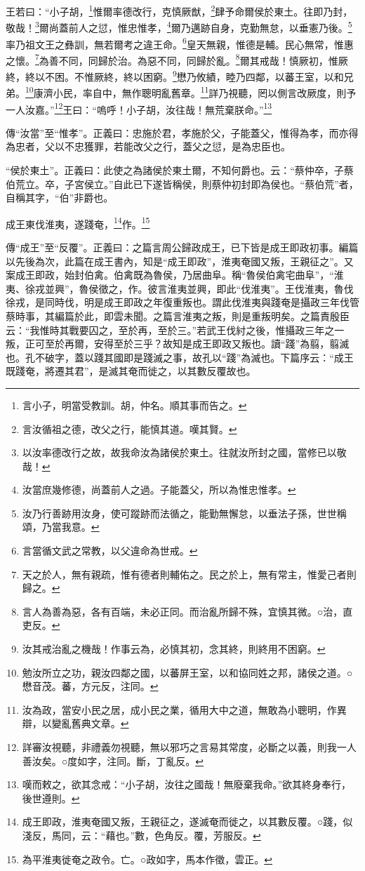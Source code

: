王若曰：“小子胡，\footnote{言小子，明當受教訓。胡，仲名。順其事而告之。}惟爾率德改行，克慎厥猷，\footnote{言汝循祖之德，改父之行，能慎其道。嘆其賢。}肆予命爾侯於東土。往即乃封，敬哉！\footnote{以汝率德改行之故，故我命汝為諸侯於東土。往就汝所封之國，當修已以敬哉！}爾尚蓋前人之愆，惟忠惟孝，\footnote{汝當庶幾修德，尚蓋前人之過。子能蓋父，所以為惟忠惟孝。}爾乃邁跡自身，克勤無怠，以垂憲乃後。\footnote{汝乃行善跡用汝身，使可蹤跡而法循之，能勤無懈怠，以垂法子孫，世世稱頌，乃當我意。}率乃祖文王之彝訓，無若爾考之違王命。\footnote{言當循文武之常教，以父違命為世戒。}皇天無親，惟德是輔。民心無常，惟惠之懷。\footnote{天之於人，無有親疏，惟有德者則輔佑之。民之於上，無有常主，惟愛己者則歸之。}為善不同，同歸於治。為惡不同，同歸於亂。\footnote{言人為善為惡，各有百端，未必正同。而治亂所歸不殊，宜慎其微。○治，直吏反。}爾其戒哉！慎厥初，惟厥終，終以不困。不惟厥終，終以困窮。\footnote{汝其戒治亂之機哉！作事云為，必慎其初，念其終，則終用不困窮。}懋乃攸績，睦乃四鄰，以蕃王室，以和兄弟。\footnote{勉汝所立之功，親汝四鄰之國，以蕃屏王室，以和協同姓之邦，諸侯之道。○懋音茂。蕃，方元反，注同。}康濟小民，率自中，無作聰明亂舊章。\footnote{汝為政，當安小民之居，成小民之業，循用大中之道，無敢為小聰明，作異辯，以變亂舊典文章。}詳乃視聽，罔以側言改厥度，則予一人汝嘉。”\footnote{詳審汝視聽，非禮義勿視聽，無以邪巧之言易其常度，必斷之以義，則我一人善汝矣。○度如字，注同。斷，丁亂反。}王曰：“嗚呼！小子胡，汝往哉！無荒棄朕命。”\footnote{嘆而敕之，欲其念戒：“小子胡，汝往之國哉！無廢棄我命。”欲其終身奉行，後世遵則。}


{\noindent\zhuan{}\fzbyks 傳“汝當”至“惟孝”。正義曰：忠施於君，孝施於父，子能蓋父，惟得為孝，而亦得為忠者，父以不忠獲罪，若能改父之行，蓋父之愆，是為忠臣也。 \par}

{\noindent\shu{}\fzkt “侯於東土”。正義曰：此使之為諸侯於東土爾，不知何爵也。云：“蔡仲卒，子蔡伯荒立。卒，子宮侯立。”自此已下遂皆稱侯，則蔡仲初封即為侯也。“蔡伯荒”者，自稱其字，“伯”非爵也。 \par}

成王東伐淮夷，遂踐奄，\footnote{成王即政，淮夷奄國又叛，王親征之，遂滅奄而徙之，以其數反覆。○踐，似淺反，馬同，云：“藉也。”數，色角反。覆，芳服反。}作。\footnote{為平淮夷徙奄之政令。亡。○政如字，馬本作徵，雲正。}


{\noindent\zhuan{}\fzbyks 傳“成王”至“反覆”。正義曰：之篇言周公歸政成王，已下皆是成王即政初事。編篇以先後為次，此篇在成王書內，知是“成王即政”，淮夷奄國又叛，王親征之”。又案成王即政，始封伯禽。伯禽既為魯侯，乃居曲阜。稱“魯侯伯禽宅曲阜”，“淮夷、徐戎並興”，魯侯徵之，作。彼言淮夷並興，即此“伐淮夷”。王伐淮夷，魯伐徐戎，是同時伐，明是成王即政之年復重叛也。謂此伐淮夷與踐奄是攝政三年伐管蔡時事，其編篇於此，即雲未聞。之篇言淮夷之叛，則是重叛明矣。之篇責殷臣云：“我惟時其戰要囚之，至於再，至於三。”若武王伐紂之後，惟攝政三年之一叛，正可至於再爾，安得至於三乎？故知是成王即政又叛也。讀“踐”為翦，翦滅也。孔不破字，蓋以踐其國即是踐滅之事，故孔以“踐”為滅也。下篇序云：“成王既踐奄，將遷其君”，是滅其奄而徙之，以其數反覆故也。 \par}

